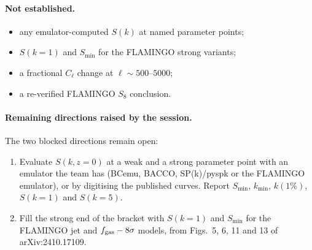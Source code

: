 \documentclass[11pt,a4paper]{article}
\begin{document}
\paragraph{Not established.}
\begin{itemize}
\item any emulator-computed $S(k)$ at named parameter points;
\item $S(k=1)$ and $S_{\min}$ for the FLAMINGO strong variants;
\item a fractional $C_\ell$ change at $\ell\sim500$--$5000$;
\item a re-verified FLAMINGO $S_8$ conclusion.
\end{itemize}

\paragraph{Remaining directions raised by the session.} The two blocked directions remain open:
\begin{enumerate}
\item Evaluate $S(k,z=0)$ at a weak and a strong parameter point with an emulator the team has (BCemu, BACCO, SP(k)/pyspk or the FLAMINGO emulator), or by digitising the published curves. Report $S_{\min}$, $k_{\min}$, $k(1\%)$, $S(k=1)$ and $S(k=5)$.
\item Fill the strong end of the bracket with $S(k=1)$ and $S_{\min}$ for the FLAMINGO jet and $f_{\rm gas}-8\sigma$ models, from Figs.~5, 6, 11 and 13 of arXiv:2410.17109.
\end{enumerate}
\end{document}
